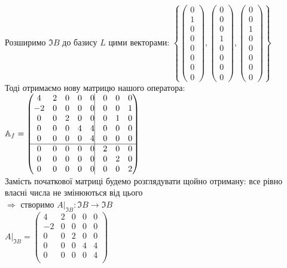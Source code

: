 \documentclass[a4paper, 14pt]{extarticle}
\begin{document}
Розширимо $\Im B$ до базису $L$ цими векторами: $\left\{ \begin{pmatrix} 0 \\ 1 \\ 0 \\ 0 \\ 0 \\ 0 \\ 0 \\ 0 \end{pmatrix}, \begin{pmatrix} 0 \\ 0 \\ 0 \\ 1 \\ 0 \\ 0 \\ 0 \\ 0 \end{pmatrix}, \begin{pmatrix} 0 \\ 0 \\ 1 \\ 0 \\ 0 \\ 0 \\ 0 \\ 0 \end{pmatrix} \right\}$\\
Тоді отримаємо нову матрицю нашого оператора:\\
$\mathbb{A}_f = \begin{pmatrix}
4 & 2 & 0 & 0 & 0 \vline & 0 & 0 & 0\\
-2 & 0 & 0 & 0 & 0 \vline & 0 & 0 & 1 \\
0 & 0 & 2 & 0 & 0 \vline & 0 & 1 & 0 \\
0 & 0 & 0 & 4 & 4 \vline & 0 & 0 & 0\\
0 & 0 & 0 & 0 & 4 \vline & 0 & 0 & 0\\
\hline
0 & 0 & 0 & 0 & 0 \vline & 2 & 0 & 0\\
0 & 0 & 0 & 0 & 0 \vline & 0 & 2 & 0 \\
0 & 0 & 0 & 0 & 0 \vline & 0 & 0 & 2\\
\end{pmatrix}$\\
Замість початкової матриці будемо розглядувати щойно отриману: все рівно власні числа не змінюються від цього\\
$\Rightarrow$ створимо $A|_{\Im B}: \Im B \to \Im B$\\
$A|_{\Im B} = \begin{pmatrix}
4 & 2 & 0 & 0 & 0 \\
-2 & 0 & 0 & 0 & 0 \\
0 & 0 & 2 & 0 & 0 \\
0 & 0 & 0 & 4 & 4 \\
0 & 0 & 0 & 0 & 4 \\
\end{pmatrix}$
\newpage
\end{document}
